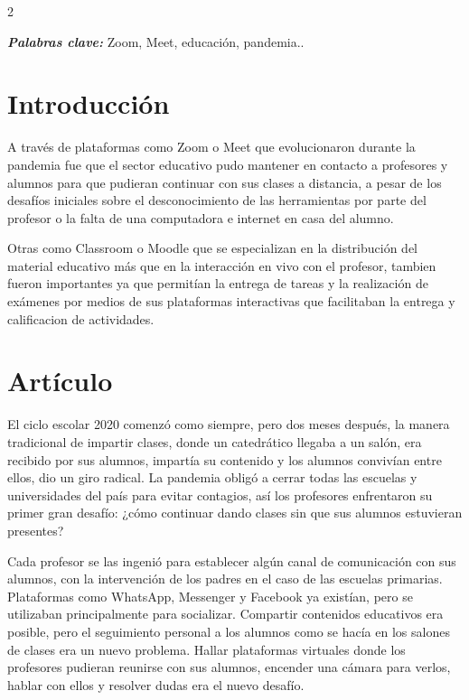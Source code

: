 \documentclass[12pt,spanish,Letterpaper,openany]{book}
\begin{document}
\begin {multicols}{2}

\textbf{\emph{Palabras clave:}} Zoom, Meet, educación, pandemia..

\hypertarget{introducciuxf3n-7}{%
\section{Introducción}\label{introducciuxf3n-7}}

A través de plataformas como Zoom o Meet que evolucionaron durante la pandemia fue que
el sector educativo pudo mantener en contacto a profesores y alumnos para que pudieran
continuar con sus clases a distancia, a pesar de los desafíos iniciales sobre el desconocimiento
de las herramientas por parte del profesor o la falta de una computadora e internet en casa
del alumno.

Otras como Classroom o Moodle que se especializan en la distribución del material educativo
más que en la interacción en vivo con el profesor, tambien fueron importantes ya que
permitían la entrega de tareas y la realización de exámenes por medios de sus plataformas
interactivas que facilitaban la entrega y calificacion de actividades.

\hypertarget{artuxedculo-7}{%
\section{Artículo}\label{artuxedculo-7}}

El ciclo escolar 2020 comenzó como siempre, pero dos meses después, la manera tradicional
de impartir clases, donde un catedrático llegaba a un salón, era recibido por sus alumnos,
impartía su contenido y los alumnos convivían entre ellos, dio un giro radical. La pandemia
obligó a cerrar todas las escuelas y universidades del país para evitar contagios, así los
profesores enfrentaron su primer gran desafío: ¿cómo continuar dando clases sin que sus
alumnos estuvieran presentes?

Cada profesor se las ingenió para establecer algún canal de comunicación con sus alumnos,
con la intervención de los padres en el caso de las escuelas primarias. Plataformas como
WhatsApp, Messenger y Facebook ya existían, pero se utilizaban principalmente para
socializar. Compartir contenidos educativos era posible, pero el seguimiento personal a los
alumnos como se hacía en los salones de clases era un nuevo problema. Hallar plataformas
virtuales donde los profesores pudieran reunirse con sus alumnos, encender una cámara para
verlos, hablar con ellos y resolver dudas era el nuevo desafío.


\end{multicols}
\end{document}
